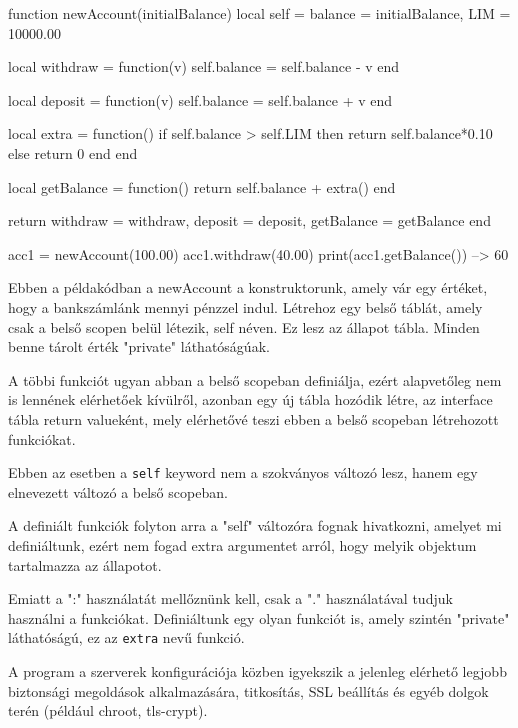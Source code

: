\begin{lua}
function newAccount(initialBalance)
	local self = {balance = initialBalance, LIM = 10000.00}

	local withdraw = function(v)
		self.balance = self.balance - v
	end

	local deposit = function(v)
		self.balance = self.balance + v
	end
	
	local extra = function()
		if self.balance > self.LIM then
			return self.balance*0.10
		else
			return 0
		end
	end

	local getBalance = function() return self.balance + extra() end

	return {
		withdraw = withdraw,
		deposit = deposit,
		getBalance = getBalance
	}
end

acc1 = newAccount(100.00)
acc1.withdraw(40.00)
print(acc1.getBalance())     --> 60
\end{lua}
Ebben a példakódban a newAccount a konstruktorunk, amely vár egy értéket, hogy a bankszámlánk mennyi pénzzel indul. Létrehoz egy belső táblát, amely csak a belső scopen belül létezik, self néven. Ez lesz az állapot tábla. Minden benne tárolt érték "private" láthatóságúak. 

A többi funkciót ugyan abban a belső scopeban definiálja, ezért alapvetőleg nem is lennének elérhetőek kívülről, azonban egy új tábla hozódik létre, az interface tábla return valueként, mely elérhetővé teszi ebben a belső scopeban létrehozott funkciókat.

Ebben az esetben a \texttt{self} keyword nem a szokványos változó lesz, hanem egy elnevezett változó a belső scopeban. 

\pagebreak

A definiált funkciók folyton arra a "self" változóra fognak hivatkozni, amelyet mi definiáltunk, ezért nem fogad extra argumentet arról, hogy melyik objektum tartalmazza az állapotot.

Emiatt a ":" használatát mellőznünk kell, csak a "." használatával tudjuk használni a funkciókat. Definiáltunk egy olyan funkciót is, amely szintén "private" láthatóságú, ez az \texttt{extra} nevű funkció. \cite {classes}


A program a szerverek konfigurációja közben igyekszik a jelenleg elérhető legjobb biztonsági megoldások alkalmazására, titkosítás, SSL beállítás és egyéb dolgok terén (például chroot, tls-crypt).

